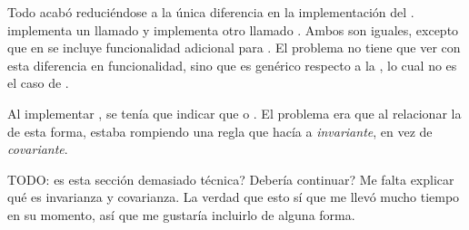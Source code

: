 Todo acabó reduciéndose a la única diferencia en la implementación del \trait
{}.  implementa un \trait llamado
 y  implementa otro llamado
. Ambos \traits son iguales, excepto que en 
se incluye funcionalidad adicional para \abistable. El problema no tiene que ver
con esta diferencia en funcionalidad, sino que  es
genérico respecto a la \lifetime {}, lo cual no es el caso de
.

Al implementar , se tenía que indicar que  o . El problema era que al relacionar la \lifetime {} de
esta forma, estaba rompiendo una regla que hacía a 
\emph{invariante}, en vez de \emph{covariante}.

TODO: es esta sección demasiado técnica? Debería continuar? Me falta explicar
qué es invarianza y covarianza. La verdad que esto sí que me llevó mucho tiempo
en su momento, así que me gustaría incluirlo de alguna forma.
